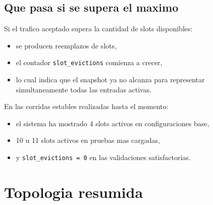 \documentclass[12pt,a4paper]{report}
\begin{document}
\section{Que pasa si se supera el maximo}

Si el trafico aceptado supera la cantidad de slots disponibles:

\begin{itemize}
    \item se producen reemplazos de slots,
    \item el contador \texttt{slot\_evictions} comienza a crecer,
    \item lo cual indica que el snapshot ya no alcanza para representar simultaneamente todas las entradas activas.
\end{itemize}

En las corridas estables realizadas hasta el momento:

\begin{itemize}
    \item el sistema ha mostrado 4 slots activos en configuraciones base,
    \item 10 u 11 slots activos en pruebas mas cargadas,
    \item y \texttt{slot\_evictions = 0} en las validaciones satisfactorias.
\end{itemize}

\chapter{Topologia resumida}
\end{document}

